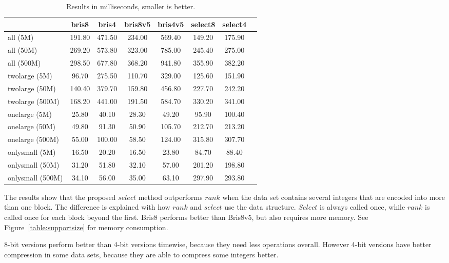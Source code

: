 \begin{table}
\centering
\caption{Results in milliseconds, smaller is better.\label{table:results1}}
\begin{tabular}{l||c c c c c c c} 
& bris8 & bris4 & bris8v5 & bris4v5 & select8 & select4  \\
 \hline \hline 
all (5M)   & 191.80 & 471.50 & 234.00 & 569.40 & 149.20 & 175.90 \\
all (50M)   & 269.20 & 573.80 & 323.00 & 785.00 & 245.40 & 275.00 \\
all (500M)   & 298.50 & 677.80 & 368.20 & 941.80 & 355.90 & 382.20 \\
twolarge (5M)   & 96.70 & 275.50 & 110.70 & 329.00 & 125.60 & 151.90 \\
twolarge (50M)   & 140.40 & 379.70 & 159.80 & 456.80 & 227.70 & 242.20 \\
twolarge (500M)   & 168.20 & 441.00 & 191.50 & 584.70 & 330.20 & 341.00 \\
onelarge (5M)   & 25.80 & 40.10 & 28.30 & 49.20 & 95.90 & 100.40 \\
onelarge (50M)   & 49.80 & 91.30 & 50.90 & 105.70 & 212.70 & 213.20 \\
onelarge (500M)   & 55.00 & 100.00 & 58.50 & 124.00 & 315.80 & 307.70 \\
onlysmall (5M)   & 16.50 & 20.20 & 16.50 & 23.80 & 84.70 & 88.40 \\
onlysmall (50M)   & 31.20 & 51.80 & 32.10 & 57.00 & 201.20 & 198.80 \\
onlysmall (500M)   & 34.10 & 56.00 & 35.00 & 63.10 & 297.90 & 293.80 \\




\hline
%
\end{tabular}
\end{table}

The results show that the proposed $select$ method outperforms $rank$ when the data set contains several integers that are encoded into more than one block. The difference is explained 
with how $rank$ and $select$ use the data structure. $Select$ is always called once, while $rank$ is called once for each block beyond the first. Bris8 performs better than Bris8v5, but also requires 
more memory. See Figure~\ref{table:supportsize} for memory consumption.

8-bit versions perform better than 4-bit versions timewise, because they need less operations overall. However 4-bit versions have better compression in some data sets, because they are able to compress 
some integers better. 


